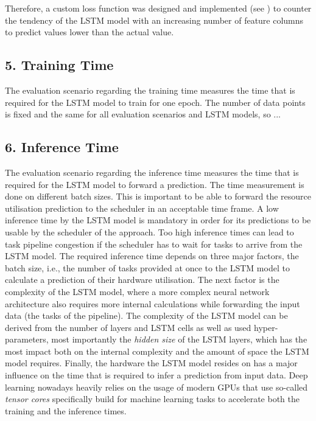       Therefore, a custom loss function was designed and implemented (see ) to counter the tendency of the LSTM model with an increasing number of feature columns to predict values lower than the actual value.

  \subsection*{5. Training Time}
  \label{sec:training-time-evaluation-scenarios}

    The evaluation scenario regarding the training time measures the time that is required for the LSTM model to train for one epoch. The number of data points is fixed and the same for all evaluation scenarios and LSTM models, so ...

  \subsection*{6. Inference Time}
  \label{sec:inference-time-evaluation-scenarios}

    The evaluation scenario regarding the inference time measures the time that is required for the LSTM model to forward a prediction.
    The time measurement is done on different batch sizes. This is important to be able to forward the resource utilisation prediction to the scheduler in an acceptable time frame.
    A low inference time by the LSTM model is mandatory in order for its predictions to be usable by the scheduler of the  approach. Too high inference times can lead to task pipeline congestion if the scheduler has to wait for tasks to arrive from the LSTM model.
    The required inference time depends on three major factors, the batch size, i.e., the number of tasks provided at once to the LSTM model to calculate a prediction of their hardware utilisation.
    The next factor is the complexity of the LSTM model, where a more complex neural network architecture also requires more internal calculations while forwarding the input data (the tasks of the pipeline). The complexity of the LSTM model can be derived from the number of layers and LSTM cells as well as used hyper-parameters, most importantly the \emph{hidden size} of the LSTM layers, which has the most impact both on the internal complexity and the amount of space the LSTM model requires.
    Finally, the hardware the LSTM model resides on has a major influence on the time that is required to infer a prediction from input data. Deep learning nowadays heavily relies on the usage of modern GPUs that use so-called \emph{tensor cores} specifically build for machine learning tasks to accelerate both the training and the inference times.


